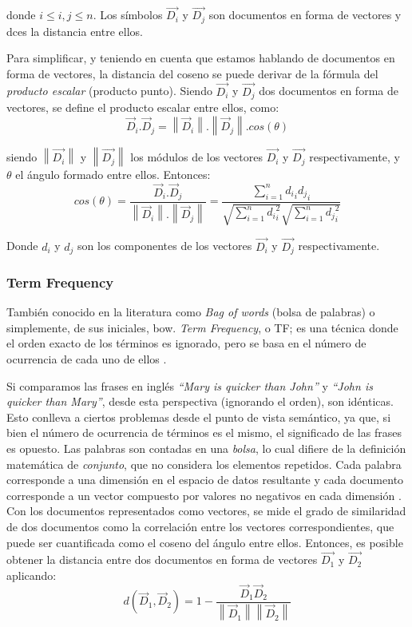 donde \(i \leq i,j \leq n\). Los símbolos \(\overrightarrow{D_i}\) y \(\overrightarrow{D_j}\) son documentos en forma de vectores y dces la distancia entre ellos.

\bigskip Para simplificar, y teniendo en cuenta que estamos hablando de documentos en forma de vectores, la distancia del coseno se puede derivar de la fórmula del \textit{producto escalar} (producto punto). Siendo \(\overrightarrow{D_i}\) y \(\overrightarrow{D_j}\) dos documentos en forma de vectores, se define el producto escalar entre ellos, como:
\[\vec{D}_i.\vec{D}_j = \left \| \vec{D}_i \right \|.\left \| \vec{D}_j \right \|.cos(\theta)\]

siendo \(\left \|\overrightarrow{D_i}\right \|\) y \(\left \|\overrightarrow{D_j}\right \|\) los módulos de los vectores \(\overrightarrow{D_i}\) y \(\overrightarrow{D_j}\) respectivamente, y $\theta$ el ángulo formado entre ellos. Entonces:
\[cos(\theta) = \frac{\vec{D}_i.\vec{D}_j}{\left \| \vec{D}_i \right \|.\left \| \vec{D}_j \right \|}=\frac{\sum_{i=1}^{n}{{d_i}_i{d_j}_i}}{\sqrt{\sum_{i=1}^{n}{{d_i}_i^{2}}}\sqrt{\sum_{i=1}^{n}{{d_j}_i^{2}}}}\]

Donde \(d_i\) y \(d_j\) son los componentes de los vectores \(\overrightarrow{D_i}\) y \(\overrightarrow{D_j}\) respectivamente.

\subsubsection{Term Frequency}
También conocido en la literatura como \textit{Bag of words} (bolsa de palabras) o simplemente, de sus iniciales, bow. \textit{Term Frequency}, o TF; es una técnica donde el orden exacto de los términos es ignorado, pero se basa en el número de ocurrencia de cada uno de ellos \citep{christopher2008introduction}.

\bigskip Si comparamos las frases en inglés \textit{“Mary is quicker than John”} y \textit{“John is quicker than Mary”}, desde esta perspectiva (ignorando el orden), son idénticas. Esto conlleva a ciertos problemas desde el punto de vista semántico, ya que, si bien el número de ocurrencia de términos es el mismo, el significado de las frases es opuesto. Las palabras son contadas en una \textit{bolsa}, lo cual difiere de la definición matemática de \textit{conjunto}, que no considera los elementos repetidos. Cada palabra corresponde a una dimensión en el espacio de datos resultante y cada documento corresponde a un vector compuesto por valores no negativos en cada dimensión \citep{huang2008similarity}. Con los documentos representados como vectores, se mide el grado de similaridad de dos documentos como la correlación entre los vectores correspondientes, que puede ser cuantificada como el coseno del ángulo entre ellos. Entonces, es posible obtener la distancia entre dos documentos en forma de vectores \(\overrightarrow{D_1}\) y \(\overrightarrow{D_2}\) aplicando:
\[d(\vec{D}_1, \vec{D}_2) = 1 - \frac{\vec{D}_1 \vec{D}_2}{\left \| \vec{D}_1 \right\| \left \| \vec{D}_2 \right\|}\]

